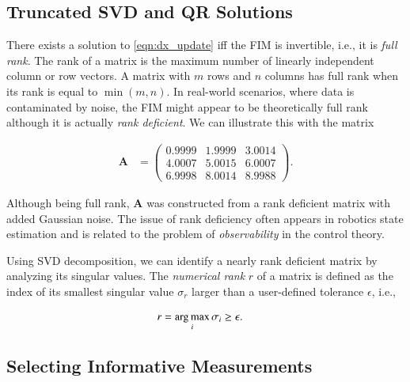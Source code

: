 \subsection{Truncated SVD and QR Solutions}
There exists a solution to \eqref{eqn:dx_update}
iff the FIM is invertible, i.e., it is \emph{full rank}. The rank of a
matrix is the maximum number of linearly independent column or row vectors. A
matrix with $m$ rows and $n$ columns has full rank when its rank is equal to
$\min(m,n)$. In real-world scenarios, where data is contaminated by noise, the
FIM might appear to be theoretically full rank although it is actually
\emph{rank deficient}. We can illustrate this with the matrix

\begin{equation}\label{eqn:rank_deficient_matrix}
  \begin{aligned}
    \mathbf{A} &=
    \begin{pmatrix}
    0.9999&1.9999&3.0014\\
    4.0007&5.0015&6.0007\\
    6.9998&8.0014&8.9988
    \end{pmatrix}.
  \end{aligned}
\end{equation}

Although being full rank, $\mathbf{A}$ was constructed from a rank deficient
matrix with added Gaussian noise. The issue of rank deficiency often appears in
robotics state estimation and is related to the problem of \emph{observability}
in the control theory.

Using SVD decomposition, we can identify a nearly rank deficient matrix by
analyzing its singular values. The \emph{numerical rank} $r$ of a matrix is
defined as the index of its smallest singular value $\sigma_r$ larger than
a user-defined tolerance $\epsilon$, i.e.,

\begin{equation}\label{eqn:numerical_rank}
  \begin{aligned}
  r &= \operatorname*{arg\,max}_i \sigma_i\geq\epsilon.
  \end{aligned}
\end{equation}

\subsection{Selecting Informative Measurements}

